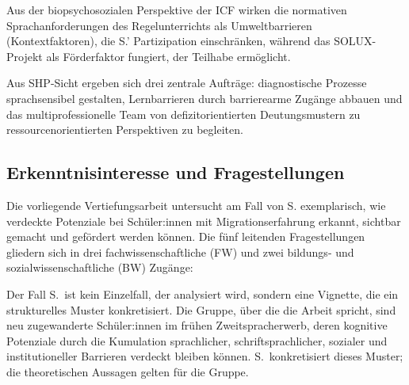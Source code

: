 \documentclass[ngerman, a4paper]{article}
\begin{document}
Aus der biopsychosozialen Perspektive der ICF wirken die normativen
Sprachanforderungen des Regelunterrichts als Umweltbarrieren (Kontextfaktoren),
die S.' Partizipation einschränken, während das SOLUX-Projekt als Förderfaktor
fungiert, der Teilhabe ermöglicht.

Aus SHP-Sicht ergeben sich drei zentrale Aufträge: diagnostische Prozesse sprachsensibel
gestalten, Lernbarrieren durch barrierearme Zugänge abbauen und das multiprofessionelle
Team von defizitorientierten Deutungsmustern zu ressourcenorientierten Perspektiven zu begleiten.
 
\subsection*{Erkenntnisinteresse und Fragestellungen}
 
Die vorliegende Vertiefungsarbeit untersucht am Fall von S. exemplarisch, wie verdeckte
Potenziale bei Schüler:innen mit Migrationserfahrung erkannt, sichtbar gemacht und
gefördert werden können. Die fünf leitenden Fragestellungen gliedern sich in drei
fachwissenschaftliche (FW) und zwei bildungs- und sozialwissenschaftliche (BW) Zugänge:

Der Fall S.\ ist kein Einzelfall, der analysiert wird, sondern eine
Vignette, die ein strukturelles Muster konkretisiert. Die Gruppe, über
die die Arbeit spricht, sind neu zugewanderte Schüler:innen im frühen
Zweitspracherwerb, deren kognitive Potenziale durch die Kumulation
sprachlicher, schriftsprachlicher, sozialer und institutioneller
Barrieren verdeckt bleiben können. S.\ konkretisiert dieses Muster;
die theoretischen Aussagen gelten für die Gruppe.
\end{document}
